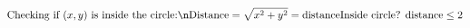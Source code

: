\documentclass[preview]{standalone}
\begin{document}
\begin{align*}
\text{Checking if } (x, y) \text{ is inside the circle:}\n \text{Distance} = \sqrt{x^2 + y^2} = \text{distance} \text{Inside circle? } \text{distance} \leq 2
\end{align*}
\end{document}
